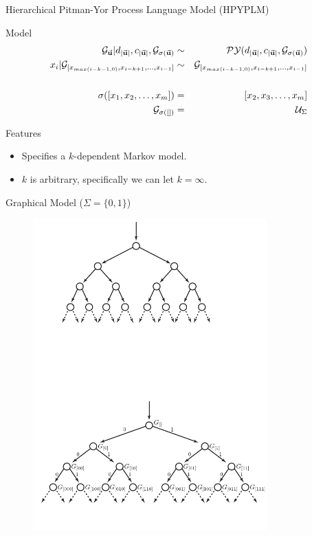 \documentclass{beamer}
\newcommand{\G}{\mathcal{G}}
\newcommand{\PY}{\mathcal{P}\mathcal{Y}}
\newcommand{\bu}{{\bf u}}
\begin{document}

\begin{frame}[t]{Hierarchical Pitman-Yor Process Language Model (HPYPLM)\cite{teh2006a}}
	\begin{block}{Model}
		\begin{eqnarray*}
			\G_{\vec {\bf u}} | d_{| \vec \bu |}, c_{| \vec \bu |}, \G_{\sigma(\vec \bu)} &\sim& \PY(d_{| \vec \bu |}, c_{| \vec \bu |}, \G_{\sigma(\vec \bu)}) \\
			x_i | \G_{[x_{max({i-k-1,0})}, x_{i-k+1}, \ldots, x_{i-1}]} &\sim& \G_{[x_{max({i-k-1,0})}, x_{i-k+1}, \ldots, x_{i-1}]}\\
			\\
			\sigma([x_1, x_2, \ldots, x_m]) &=& [x_2, x_3, \ldots, x_m]\\
			\G_{\sigma([])} &=& \mathcal{U}_\Sigma
		\end{eqnarray*}
	\end{block}
	
	\begin{block}{Features}
		\begin{itemize}
			\item Specifies a $k$-dependent Markov model.
			\item $k$ is arbitrary, specifically we can let $k = \infty$.
		\end{itemize}
	\end{block}
	
\end{frame}


\begin{frame}{Graphical Model ($\Sigma = \{0,1\}$)}
\begin{figure}[t]
		\begin{center}
			\includegraphics[width = 9cm, trim = 1cm 1cm 1cm 10cm]{../figs/base.pdf}
		\end{center}
	\end{figure}
\end{frame}
\end{document}
